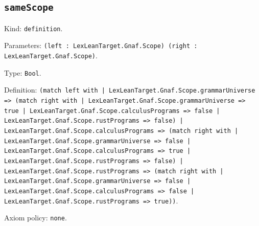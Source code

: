 \documentclass[11pt]{article}
\begin{document}
\subsection*{\texttt{sameScope}}
\noindent Kind: \texttt{definition}.\par
\noindent Parameters: \texttt{(left : LexLeanTarget.Gnaf.Scope) (right : LexLeanTarget.Gnaf.Scope)}.\par
\noindent Type: \texttt{Bool}.\par
\noindent Definition: \texttt{(match left with | LexLeanTarget.Gnaf.Scope.grammarUniverse => (match right with | LexLeanTarget.Gnaf.Scope.grammarUniverse => true | LexLeanTarget.Gnaf.Scope.calculusPrograms => false | LexLeanTarget.Gnaf.Scope.rustPrograms => false) | LexLeanTarget.Gnaf.Scope.calculusPrograms => (match right with | LexLeanTarget.Gnaf.Scope.grammarUniverse => false | LexLeanTarget.Gnaf.Scope.calculusPrograms => true | LexLeanTarget.Gnaf.Scope.rustPrograms => false) | LexLeanTarget.Gnaf.Scope.rustPrograms => (match right with | LexLeanTarget.Gnaf.Scope.grammarUniverse => false | LexLeanTarget.Gnaf.Scope.calculusPrograms => false | LexLeanTarget.Gnaf.Scope.rustPrograms => true))}.\par
\noindent Axiom policy: \texttt{none}.\par
\end{document}
